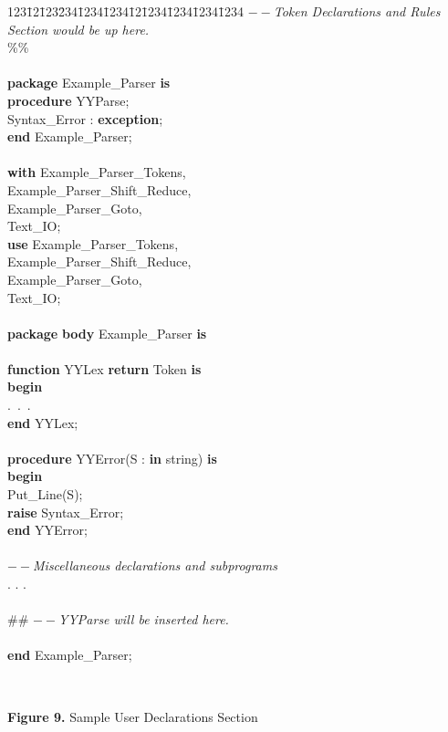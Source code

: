 \begin{tabbing}
123\=12\=123\=234\=1234\=1234\=12\=1234\=1234\=1234\=1234 \kill
$--${\it  Token Declarations and Rules Section would be up here.}\\
\%\%\\
\\
{\bf package} Example\_Parser {\bf is}\\
\>  {\bf procedure} YYParse;\\
\>  Syntax\_Error : {\bf exception};\\
{\bf end} Example\_Parser;\\
\\
{\bf with} Example\_Parser\_Tokens,\\
\>\>     Example\_Parser\_Shift\_Reduce,\\
\>\>     Example\_Parser\_Goto,\\
\>\>     Text\_IO;\\
{\bf use}  Example\_Parser\_Tokens,\\
\>\>     Example\_Parser\_Shift\_Reduce,\\
\>\>     Example\_Parser\_Goto,\\
\>\>     Text\_IO;\\
\\
{\bf package} {\bf body} Example\_Parser {\bf is}\\
\\
\>  {\bf function} YYLex {\bf return} Token {\bf is}\\
\>  {\bf begin}\\
\>\>    .\ .\ .\\
\>  {\bf end} YYLex;\\
\\
\>  {\bf procedure} YYError(S : {\bf in} string) {\bf is}\\
\>  {\bf begin}\\
\>\>    Put\_Line(S);\\
\>\>    {\bf raise} Syntax\_Error;\\
\>  {\bf end} YYError;\\
\\
\>  $--${\it  Miscellaneous declarations and subprograms}\\
\>  . . .\\
\\
\#\#  $--${\it  YYParse will be inserted here.}\\
\\
{\bf end} Example\_Parser;\\
\end{tabbing}
\hspace{-0.05in}\hrulefill\hspace{0.0in}\\
\centerline{{\bf Figure 9.} Sample User Declarations Section}
